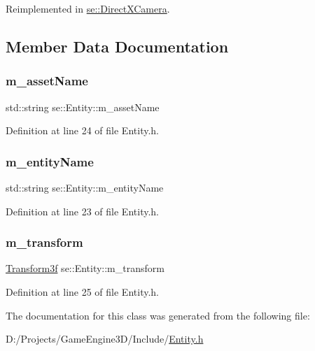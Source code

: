 Reimplemented in \mbox{\hyperlink{classse_1_1_direct_x_camera_ae313a5d5a4d2c1b88e5f40285b31b921}{se\+::\+Direct\+X\+Camera}}.



\subsection{Member Data Documentation}
\mbox{\label{classse_1_1_entity_aba1f7cc3700caee65b20c423185ab7ca}} 
\subsubsection{\texorpdfstring{m\+\_\+asset\+Name}{m\_assetName}}
{\footnotesize\ttfamily std\+::string se\+::\+Entity\+::m\+\_\+asset\+Name\hspace{0.3cm}{\ttfamily [protected]}}



Definition at line 24 of file Entity.\+h.

\mbox{\label{classse_1_1_entity_ad4e3cc82e88be87565d00fdf10c18b12}} 
\subsubsection{\texorpdfstring{m\+\_\+entity\+Name}{m\_entityName}}
{\footnotesize\ttfamily std\+::string se\+::\+Entity\+::m\+\_\+entity\+Name\hspace{0.3cm}{\ttfamily [protected]}}



Definition at line 23 of file Entity.\+h.

\mbox{\label{classse_1_1_entity_a85a408963ce0920c7bc3bfec29266238}} 
\subsubsection{\texorpdfstring{m\+\_\+transform}{m\_transform}}
{\footnotesize\ttfamily \mbox{\hyperlink{classse_1_1_transform3f}{Transform3f}} se\+::\+Entity\+::m\+\_\+transform\hspace{0.3cm}{\ttfamily [protected]}}



Definition at line 25 of file Entity.\+h.



The documentation for this class was generated from the following file\+:\begin{DoxyCompactItemize}
\item 
D\+:/\+Projects/\+Game\+Engine3\+D/\+Include/\mbox{\hyperlink{_entity_8h}{Entity.\+h}}\end{DoxyCompactItemize}
